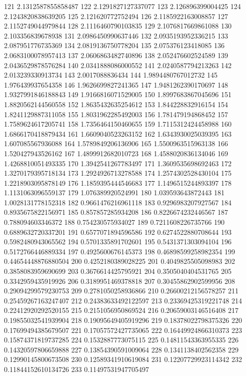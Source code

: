 121 2.1312587855858487
122 2.1291827127337077
123 2.126896399004425
124 2.1243820838639205
125 2.121620772752494
126 2.1185922163008857
127 2.1152749044979844
128 2.1116460790103835
129 2.1076817669861088
130 2.103356839678938
131 2.0986450990637446
132 2.0935193952336215
133 2.087951776735369
134 2.0819136750778204
135 2.075376123418085
136 2.0683100078957413
137 2.0606863482740896
138 2.052476602524589
139 2.0436529878576284
140 2.0341888086000552
141 2.0240587794213263
142 2.013239330913734
143 2.0017088836434
144 1.9894480767012732
145 1.976439937654358
146 1.9626699827241365
147 1.9481262390170697
148 1.9327991846188843
149 1.9166816071529005
150 1.8997683867045696
151 1.8820562144560558
152 1.8635432635254612
153 1.844228832916154
154 1.8241129887311058
155 1.8031962285492003
156 1.781479194868452
157 1.7589624617205741
158 1.7356464150460655
159 1.7115312424458988
160 1.6866170418879434
161 1.6609040523263152
162 1.6343930025039395
163 1.607085567936088
164 1.5789849206136906
165 1.5500963515963138
166 1.520427943526162
167 1.4899912682010723
168 1.4588020836134046
169 1.4268810051493335
170 1.3942541267783497
171 1.3609535698692463
172 1.3270179395718134
173 1.2924926713278588
174 1.2574302528430104
175 1.2218903095878149
176 1.1859395444546683
177 1.1496515244893397
178 1.1131063096559137
179 1.076389920524991
180 1.039593643872443
181 1.0028131778152318
182 0.9661476216961118
183 0.9296983207927567
184 0.8935675822156971
185 0.857857285934208
186 0.8226674232446567
187 0.788094603346372
188 0.754230575934027
189 0.7211608226735766
190 0.6889632720337201
191 0.6577071894596586
192 0.6274522880708644
193 0.5982480943065562
194 0.5701335891702601
195 0.5431371303094104
196 0.5172766446889334
197 0.4925600676145373
198 0.46898599258982354
199 0.44654448876880504
200 0.4252180389028225
201 0.4049825505098983
202 0.3858083959690699
203 0.3676614425795921
204 0.3505040404531765
205 0.3342959435919926
206 0.3189951469378818
207 0.30455862902599956
208 0.29094299579230753
209 0.2781050258936866
210 0.26600212156578257
211 0.25459267163247407
212 0.24383633492122597
213 0.23369425319221748
214 0.22412920292520155
215 0.2151056950869524
216 0.20659003146516408
217 0.19855032541939904
218 0.19095649405919296
219 0.18378022798375326
220 0.17699494385679507
221 0.17057572427735065
222 0.16449924866310373
223 0.15874371819737285
224 0.1532887773075115
225 0.14811543363955335
226 0.14320597806659888
227 0.13854390591009064
228 0.1341138402562358
229 0.12990145800673508
230 0.12589341910619084
231 0.12207729923114342
232 0.11844152610134726
233 0.11497531947705497
